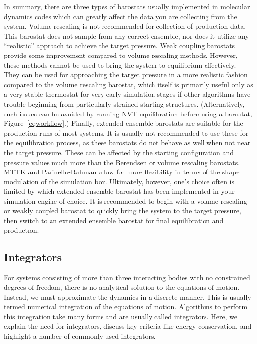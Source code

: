 \documentclass[9pt,bestpractices]{livecoms}
\begin{document}
In summary, there are three types of barostats usually implemented in molecular dynamics codes which can greatly affect the data you are collecting from the system. 
Volume rescaling is not recommended for collection of production data.
This barostat does not sample from any correct ensemble, nor does it utilize any ``realistic'' approach to achieve the target pressure.
Weak coupling barostats provide some improvement compared to volume rescaling methods.
However, these methods cannot be used to bring the system to equilibrium effectively.
They can be used for approaching the target pressure in a more realistic fashion compared to the volume rescaling barostat, which itself is primarily useful only as a very stable thermostat for very early simulation stages if other algorithms have trouble beginning from particularly strained starting structures. 
(Alternatively, such issues can be avoided by running NVT equilibration before using a barostat, Figure~\ref{eqworkflow}.)
Finally, extended ensemble barostats are suitable for the production runs of most systems.
It is usually not recommended to use these for the equilibration process, as these barostats do not behave as well when not near the target pressure.
These can be affected by the starting configuration and pressure values much more than the Berendsen or volume rescaling barostats.
MTTK and Parinello-Rahman allow for more flexibility in terms of the shape modulation of the simulation box.
Ultimately, however, one's choice often is limited by which extended-ensemble barostat has been implemented in your simulation engine of choice.
It is recommended to begin with a volume rescaling or weakly coupled barostat to quickly bring the system to the target pressure, then switch to an extended ensemble barostat for final equilibration and production.

\subsection{Integrators}
\label{sec:integrators}


For systems consisting of more than three interacting bodies with no constrained degrees of freedom, there is no analytical solution to the equations of motion.
Instead, we must approximate the dynamics in a discrete manner.
This is usually termed numerical integration of the equations of motion. 
Algorithms to perform this integration take many forms and are usually called integrators.
Here, we explain the need for integrators, discuss key criteria like energy conservation, and highlight a number of commonly used integrators.
\end{document}
